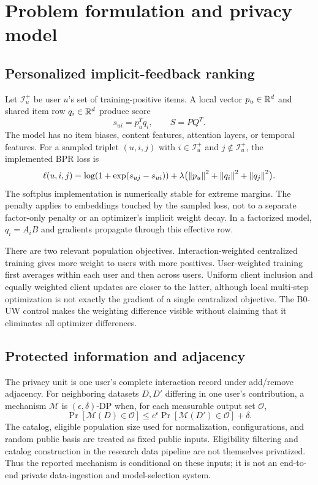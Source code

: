 \section{Problem formulation and privacy model}
\label{sec:privacy}
\subsection{Personalized implicit-feedback ranking}
Let $\mathcal I_u^+$ be user $u$'s set of training-positive items. A local vector
$p_u\in\mathbb{R}^d$ and shared item row $q_i\in\mathbb{R}^d$ produce score
\begin{equation}
 s_{ui}=p_u^Tq_i,\qquad S=PQ^T.
 \label{eq:score}
\end{equation}
The model has no item biases, content features, attention layers, or temporal
features. For a sampled triplet $(u,i,j)$ with $i\in\mathcal I_u^+$ and
$j\notin\mathcal I_u^+$, the implemented BPR loss is
\begin{equation}
 \ell(u,i,j)=\log(1+\exp(s_{uj}-s_{ui}))+
 \lambda\bigl(\left\lVert p_u\right\rVert^2+\left\lVert q_i\right\rVert^2+\left\lVert q_j\right\rVert^2\bigr).
 \label{eq:bpr}
\end{equation}
The softplus implementation is numerically stable for extreme margins. The
penalty applies to embeddings touched by the sampled loss, not to a separate
factor-only penalty or an optimizer's implicit weight decay. In a factorized
model, $q_i=A_iB$ and gradients propagate through this effective row.

There are two relevant population objectives. Interaction-weighted centralized
training gives more weight to users with more positives. User-weighted training
first averages within each user and then across users. Uniform client inclusion
and equally weighted client updates are closer to the latter, although local
multi-step optimization is not exactly the gradient of a single centralized
objective. The B0-UW control makes the weighting difference visible without
claiming that it eliminates all optimizer differences.

\subsection{Protected information and adjacency}
The privacy unit is one user's complete interaction record under add/remove
adjacency. For neighboring datasets $D,D'$ differing in one user's contribution,
a mechanism $\mathcal M$ is $(\epsilon,\delta)$-DP when, for each measurable
output set $\mathcal O$,
\begin{equation}
 \Pr[\mathcal M(D)\in\mathcal O]
 \leq e^\epsilon\Pr[\mathcal M(D')\in\mathcal O]+\delta.
 \label{eq:dp}
\end{equation}
The catalog, eligible population size used for normalization, configurations,
and random public basis are treated as fixed public inputs. Eligibility filtering
and catalog construction in the research data pipeline are not themselves
privatized. Thus the reported mechanism is conditional on these inputs; it is
not an end-to-end private data-ingestion and model-selection system.

